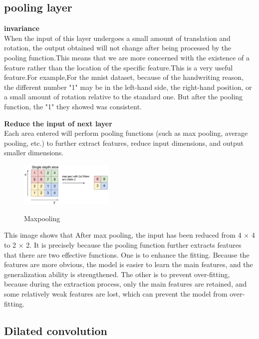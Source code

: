 \documentclass{article}
\begin{document}
\subsection{pooling layer}

\textbf{invariance}\\
When the input of this layer undergoes a small amount of translation and rotation, the output obtained will not change after being processed by the pooling function\cite{deeplearning2016}.This means that we are more concerned with the existence of a feature rather than the location of the specific feature.This is a very useful feature.For example,For the mnist dataset, because of the handwriting reason, the different number "1" may be in the left-hand side, the right-hand position, or a small amount of rotation relative to the standard one. But after the pooling function, the "1" they showed was consistent.

\textbf{Reduce the input of next layer}\\
Each area entered will perform pooling functions (such as max pooling, average pooling, etc.) to further extract features, reduce input dimensions, and output smaller dimensions.
\begin{figure}[H] %
	\centering %
	\includegraphics[width=0.4\textwidth]{./pic/part1/maxpool.jpeg} %
	\caption{Maxpooling} %
	\label{Fig.main2} %
	\cite{cs231n}
\end{figure}
This image shows that After max pooling, the input has been reduced from 4 $\times$ 4 to 2 $\times$ 2.
It is precisely because the pooling function further extracts features that there are two effective functions. One is to enhance the fitting. Because the features are more obvious, the model is easier to learn the main features, and the generalization ability is strengthened. The other is to prevent over-fitting, because during the extraction process, only the main features are retained, and some relatively weak features are lost, which can prevent the model from over-fitting\cite{DumoulinVincent2016Agtc}.

\subsection{Dilated convolution}
\end{document}
